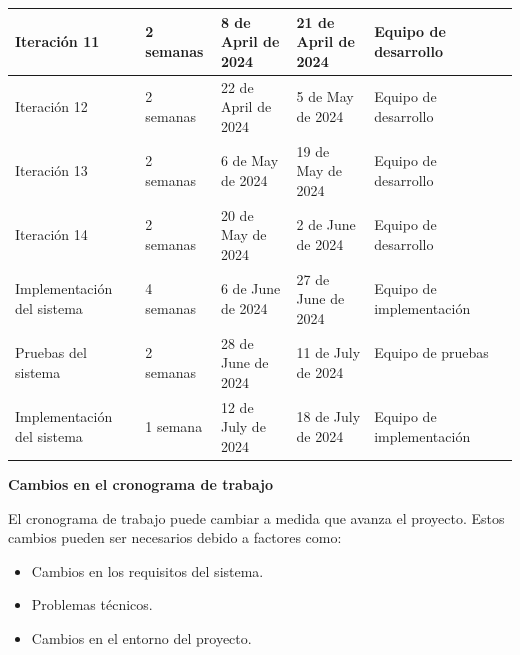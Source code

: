 \documentclass{article}
\theoremstyle{mytheoremstyle}
\theoremstyle{mytheoremstyle}
\theoremstyle{myproblemstyle}
\begin{document}
\begin{table}[!ht]
\begin{adjustbox}{max width=1.15\textwidth}
\begin{tabular}{|l|l|l|l|l|l|}
			Iteración 11               & 2 semanas         & 8 de April de 2024     & 21 de April de 2024    & Equipo de desarrollo  ~     \\ \hline
			Iteración 12               & 2 semanas         & 22 de April de 2024    & 5 de May de 2024       & Equipo de desarrollo  ~     \\ \hline
			Iteración 13               & 2 semanas         & 6 de May de 2024       & 19 de May de 2024      & Equipo de desarrollo  ~     \\ \hline
			Iteración 14               & 2 semanas         & 20 de May de 2024      & 2 de June de 2024      & Equipo de desarrollo  ~     \\ \hline
			Implementación del sistema & 4 semanas         & 6 de June de 2024      & 27 de June de 2024     & Equipo de implementación  ~ \\ \hline
			Pruebas del sistema        & 2 semanas         & 28 de June de 2024     & 11 de July de 2024     & Equipo de pruebas  ~        \\ \hline
			Implementación del sistema & 1 semana          & 12 de July de 2024     & 18 de July de 2024     & Equipo de implementación  ~ \\ \hline
		\end{tabular}
	\end{adjustbox}
\end{table}
\textbf{Cambios en el cronograma de trabajo}

El cronograma de trabajo puede cambiar a medida que avanza el proyecto. Estos cambios pueden ser necesarios debido a factores como:
\begin{itemize}
	\item Cambios en los requisitos del sistema.
	\item Problemas técnicos.
	\item Cambios en el entorno del proyecto.
\end{itemize}


\end{document}
